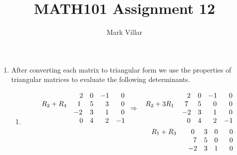\documentclass[12pt]{amsart}
\title{MATH101 Assignment 12}
\author{Mark Villar}
\begin{document}
 

\maketitle 

\begin{enumerate}
	
	\item After converting each matrix to  triangular form we use the properties of triangular matrices to 				evaluate the following determinants.   	
		\begin{enumerate}
			\item 
			\begin{align}
				\begin{array}{cccc}
					\hspace{1.8cm} \text{ } \text{ }2 &0 &-1 &\text{ } \text{ }0 \\
					R_2+R_4 \hspace{0.3cm} \text{ } \text{ }1 &5 &\text{ } \text{ }3 &\text{ } \text{ }0 \\
					\hspace{1.7cm} -2 &3 &\text{ } \text{ }1 &\text{ } \text{ }0 \\
					\hspace{1.8cm} \text{ } \text{ }0 &4 &\text{ } \text{ }2 &-1
				\end{array} \Rightarrow
				\begin{array}{cccc}
					\hspace{2cm} \text{ } \text{ }2 &0 &-1 &\text{ } \text{ }0 \\
					R_2+3R_1 \hspace{0.3cm} \text{ } \text{ }7 &5 &\text{ } \text{ }0 &\text{ } \text{ }0 \\
					\hspace{2cm} -2 &3 &\text{ } \text{ }1 &\text{ } \text{ }0 \\
					\hspace{2cm} \text{ } \text{ }0 &4 &\text{ } \text{ }2 &-1
				\end{array} \notag \\
				\begin{array}{cccc}
					R_1+R_3 \hspace{0.5cm} \text{ } \text{ }0 &3 &0 &\text{ } \text{ }0 \\
					\hspace{2cm} \text{ } \text{ }7 &5 &0 &\text{ } \text{ }0 \\
					\hspace{2cm} -2 &3 &1 &\text{ } \text{ }0 \\

\end{array}
\end{align}
\end{enumerate}
\end{enumerate}
\end{document}
